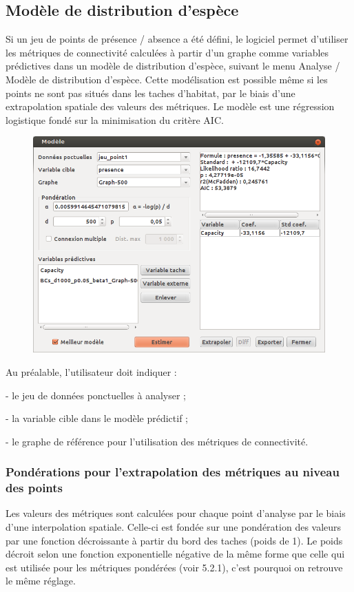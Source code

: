 \documentclass{article}
\begin{document}
\subsection{Modèle de distribution d’espèce}
\label{sdm}

Si un jeu de points de présence / absence a été défini, le logiciel permet d’utiliser les métriques de connectivité calculées à partir d’un graphe comme variables prédictives dans un modèle de distribution d’espèce, suivant le menu Analyse / Modèle de distribution d’espèce. Cette modélisation est possible même si les points ne sont pas situés dans les taches d’habitat, par le biais d’une extrapolation spatiale des valeurs des métriques. Le modèle est une régression logistique fondé sur la minimisation du critère AIC.

\begin{figure}[H]
	\includegraphics[scale=0.5]{img/manual-fr_img15.png} 
\end{figure}

Au préalable, l’utilisateur doit indiquer :

{}- le jeu de données ponctuelles à analyser ;

{}- la variable cible dans le modèle prédictif ;

{}- le graphe de référence pour l’utilisation des métriques de connectivité.

\subsubsection{Pondérations pour l’extrapolation des métriques au niveau des points}
Les valeurs des métriques sont calculées pour chaque point d’analyse par le biais d’une interpolation spatiale. Celle-ci est fondée sur une pondération des valeurs par une fonction décroissante à partir du bord des taches (poids de 1). Le poids décroit selon une fonction exponentielle négative de la même forme que celle qui est utilisée pour les métriques pondérées (voir 5.2.1), c’est pourquoi on retrouve le même réglage.
\end{document}
